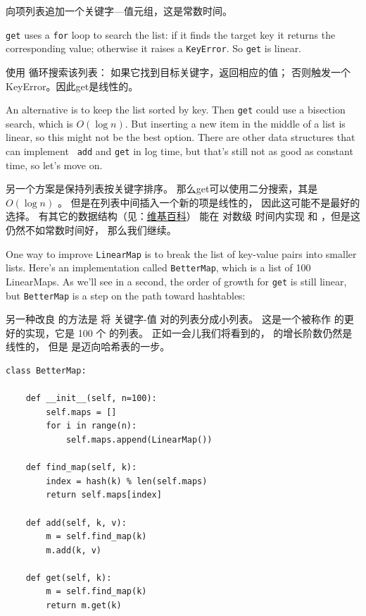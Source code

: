  向项列表追加一个关键字---值元组，这是常数时间。

{\tt get} uses a {\tt for} loop to search the list:
if it finds the target key it returns the corresponding value;
otherwise it raises a {\tt KeyError}.
So {\tt get} is linear.

 使用  循环搜索该列表： 如果它找到目标关键字，返回相应的值；
否则触发一个KeyError。因此get是线性的。

An alternative is to keep the list sorted by key.  Then {\tt get}
could use a bisection search, which is $O(\log n)$.  But inserting a
new item in the middle of a list is linear, so this might not be the
best option.  There are other data structures that can implement {\tt
  add} and {\tt get} in log time, but that's still not as good as
constant time, so let's move on.

另一个方案是保持列表按关键字排序。
那么get可以使用二分搜索，其是 $O(\log n)$ 。
但是在列表中间插入一个新的项是线性的， 因此这可能不是最好的选择。
有其它的数据结构（见：\href{http://en.wikipedia.org/wiki/Red-black_tree}{维基百科}）
能在 对数级 时间内实现  和 ，但是这仍然不如常数时间好，
那么我们继续。

One way to improve {\tt LinearMap} is to break the list of key-value
pairs into smaller lists.  Here's an implementation called
{\tt BetterMap}, which is a list of 100 LinearMaps.  As we'll see
in a second, the order of growth for {\tt get} is still linear,
but {\tt BetterMap} is a step on the path toward hashtables:

另一种改良  的方法是 将 关键字-值 对的列表分成小列表。
这是一个被称作  的更好的实现，它是 100 个  的列表。
正如一会儿我们将看到的， 的增长阶数仍然是线性的，
但是  是迈向哈希表的一步。

\begin{lstlisting}
class BetterMap:

    def __init__(self, n=100):
        self.maps = []
        for i in range(n):
            self.maps.append(LinearMap())

    def find_map(self, k):
        index = hash(k) % len(self.maps)
        return self.maps[index]

    def add(self, k, v):
        m = self.find_map(k)
        m.add(k, v)

    def get(self, k):
        m = self.find_map(k)
        return m.get(k)
\end{lstlisting}

